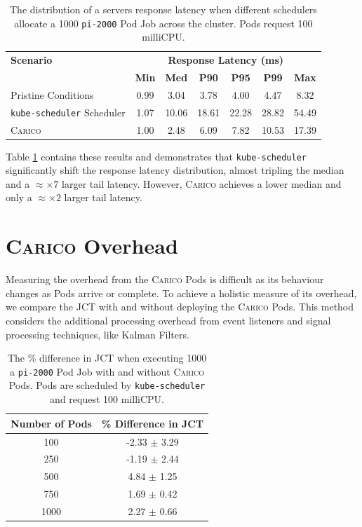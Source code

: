 \begin{table}[h!]
\centering
    \begin{tabular}{|l|c|c|c|c|c|c|}
    \hline
    \textbf{Scenario} & \multicolumn{6}{c|}{\textbf{Response Latency (ms)}} \\
    \cline{2-7}
    & \textbf{Min} & \textbf{Med} & \textbf{P90} & \textbf{P95} & \textbf{P99} & \textbf{Max} \\
    \hline
    Pristine Conditions & 0.99 & 3.04 & 3.78 & 4.00 & 4.47 & 8.32 \\
    \texttt{kube-scheduler} Scheduler & 1.07 & 10.06 & 18.61 & 22.28 & 28.82 & 54.49\\
    \textsc{Carico}  & 1.00 & 2.48 & 6.09 & 7.82 & 10.53 & 17.39\\
    \hline
    \end{tabular}
    \caption{The distribution of a servers response latency when different
    schedulers allocate a 1000 \texttt{pi-2000} Pod Job across the cluster. Pods
    request 100 milliCPU.}
    \label{tab:impacted-latency}
\end{table}

Table \ref{tab:impacted-latency} contains these results and demonstrates that
\texttt{kube-scheduler} significantly shift the response latency distribution,
almost tripling the median and a $\approx \times 7$ larger tail latency.
However, \textsc{Carico} achieves a lower median and only a $\approx \times2$
larger tail latency.

\section{\textsc{Carico} Overhead}
\label{sec:eval-overhead}
Measuring the overhead from the \textsc{Carico} Pods is difficult as its
behaviour changes as Pods arrive or complete. To achieve a holistic measure of
its overhead, we compare the JCT with and without deploying
the \textsc{Carico} Pods. This method considers the additional processing
overhead from event listeners and signal processing techniques, like Kalman
Filters.

\begin{table}[ht!]
\centering
    \begin{tabular}{|c|c|}
    \hline
    \textbf{Number of Pods} & \textbf{\% Difference in JCT} \\
    \hline
        100 & -2.33 $\pm$ 3.29 \\
        250 & -1.19 $\pm$ 2.44 \\
        500 & 4.84  $\pm$ 1.25 \\
        750 & 1.69  $\pm$ 0.42 \\
        1000 & 2.27  $\pm$ 0.66 \\
    \hline
    \end{tabular}
    \caption{The \% difference in JCT when executing 1000 a \texttt{pi-2000}
    Pod Job with and without \textsc{Carico} Pods. Pods are scheduled by
    \texttt{kube-scheduler} and request 100 milliCPU.}
    \label{tab:overhead}
\end{table}

